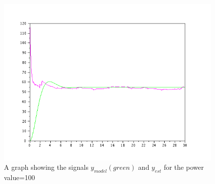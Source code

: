 \begin{figure}[H]
\includegraphics[scale=0.5]{images/100_dat_performance.png}
\caption{A graph showing the signals $y _{model}(green)$ and $y _{est}$ for the power value=100}
\end{figure}

